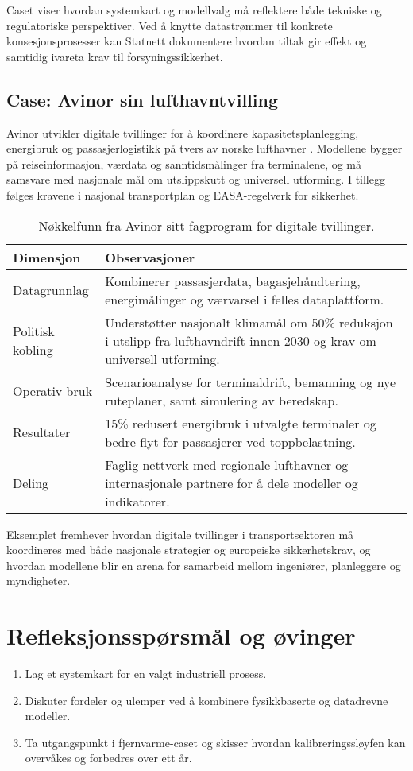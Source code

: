 Caset viser hvordan systemkart og modellvalg må reflektere både tekniske og regulatoriske perspektiver. Ved å knytte datastrømmer til konkrete konsesjonsprosesser kan Statnett dokumentere hvordan tiltak gir effekt og samtidig ivareta krav til forsyningssikkerhet.

\subsection{Case: Avinor sin lufthavntvilling}
Avinor utvikler digitale tvillinger for å koordinere kapasitetsplanlegging, energibruk og passasjerlogistikk på tvers av norske lufthavner \citep{avinor2022digital}. Modellene bygger på reiseinformasjon, værdata og sanntidsmålinger fra terminalene, og må samsvare med nasjonale mål om utslippskutt og universell utforming. I tillegg følges kravene i nasjonal transportplan og EASA-regelverk for sikkerhet.

\begin{table}[ht]
    \centering
    \caption{Nøkkelfunn fra Avinor sitt fagprogram for digitale tvillinger.}
    \label{tab:kap02-avinor}
    \begin{tabular}{p{}p{}}
        \toprule
        \textbf{Dimensjon} & \textbf{Observasjoner} \\
        \midrule
        Datagrunnlag & Kombinerer passasjerdata, bagasjehåndtering, energimålinger og værvarsel i felles dataplattform. \\
        Politisk kobling & Understøtter nasjonalt klimamål om 50\% reduksjon i utslipp fra lufthavndrift innen 2030 og krav om universell utforming. \\
        Operativ bruk & Scenarioanalyse for terminaldrift, bemanning og nye ruteplaner, samt simulering av beredskap. \\
        Resultater & 15\% redusert energibruk i utvalgte terminaler og bedre flyt for passasjerer ved toppbelastning. \\
        Deling & Faglig nettverk med regionale lufthavner og internasjonale partnere for å dele modeller og indikatorer. \\
        \bottomrule
    \end{tabular}
\end{table}

Eksemplet fremhever hvordan digitale tvillinger i transportsektoren må koordineres med både nasjonale strategier og europeiske sikkerhetskrav, og hvordan modellene blir en arena for samarbeid mellom ingeniører, planleggere og myndigheter.

\section{Refleksjonsspørsmål og øvinger}
\begin{enumerate}
    \item Lag et systemkart for en valgt industriell prosess.
    \item Diskuter fordeler og ulemper ved å kombinere fysikkbaserte og datadrevne modeller.
    \item Ta utgangspunkt i fjernvarme-caset og skisser hvordan kalibreringssløyfen kan overvåkes og forbedres over ett år.
\end{enumerate}
